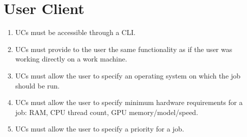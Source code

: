 \chapter{User Client}
\begin{enumerate}
 \item UCs must be accessible through a CLI.
 \item UCs must provide to the user the same functionality as if the user was working directly on a work machine.
 \item UCs must allow the user to specify an operating system on which the job should be run.
 \item UCs must allow the user to specify minimum hardware requirements for a job: RAM, CPU thread count, GPU memory/model/speed.
 \item UCs must allow the user to specify a priority for a job.
\end{enumerate}

